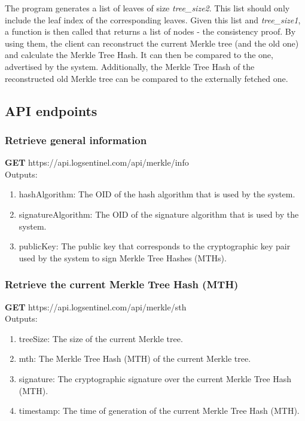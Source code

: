 \documentclass{article}
\begin{document}
	The program generates a list of leaves of size \textit{tree\_size2}. This list should only include the leaf index of the corresponding leaves. Given this list and \textit{tree\_size1}, a function is then called that returns a list of nodes - the consistency proof. By using them, the client can reconstruct the current Merkle tree (and the old one) and calculate the Merkle Tree Hash. It can then be compared to the one, advertised by the system. Additionally, the Merkle Tree Hash of the reconstructed old Merkle tree can be compared to the externally fetched one. 
	
	\subsection{API endpoints}
	
		\subsubsection{Retrieve general information}
		
		\textbf{GET} https://api.logsentinel.com/api/merkle/info \\
		
		\noindent Outputs:
		\begin{enumerate}
			\item hashAlgorithm: The OID of the hash algorithm that is used by the system.
			\item signatureAlgorithm: The OID of the signature algorithm that is used by the system.
			\item publicKey: The public key that corresponds to the cryptographic key pair used by the system to sign Merkle Tree Hashes (MTHs).
		\end{enumerate}
	
		\subsubsection{Retrieve the current Merkle Tree Hash (MTH)}
	
		\textbf{GET} https://api.logsentinel.com/api/merkle/sth \\
		
		\noindent Outputs:
		\begin{enumerate}
			\item treeSize: The size of the current Merkle tree.
			\item mth: The Merkle Tree Hash (MTH) of the current Merkle tree.
			\item signature: The cryptographic signature over the current Merkle Tree Hash (MTH).
			\item timestamp: The time of generation of the current Merkle Tree Hash (MTH).
		\end{enumerate}
		
\end{document}
